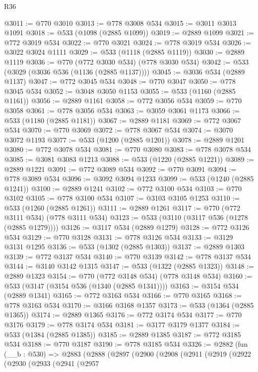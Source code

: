 \begin{lexlean}{R36}
\begin{coremodule}
@3011 := @770 @3010
@3013 := @778 @3008 @534
@3015 := @3011 @3013 @1091
@3018 := @533 (@1098 (@2885 @1099))
@3019 := @2889 @1099
@3021 := @772 @3019 @534
@3022 := @770 @3021
@3024 := @778 @3019 @534
@3026 := @3022 @3024 @1111
@3029 := @533 (@1118 (@2885 @1119))
@3030 := @2889 @1119
@3036 := @770 (@772 @3030 @534) (@778 @3030 @534)
@3042 := @533 (@3029 (@3036 @536 (@1136 (@2885 @1137))))
@3045 := @3036 @534 (@2889 @1137)
@3047 := @772 @3045 @534
@3048 := @770 @3047
@3050 := @778 @3045 @534
@3052 := @3048 @3050 @1153
@3055 := @533 (@1160 (@2885 @1161))
@3056 := @2889 @1161
@3058 := @772 @3056 @534
@3059 := @770 @3058
@3061 := @778 @3056 @534
@3063 := @3059 @3061 @1173
@3066 := @533 (@1180 (@2885 @1181))
@3067 := @2889 @1181
@3069 := @772 @3067 @534
@3070 := @770 @3069
@3072 := @778 @3067 @534
@3074 := @3070 @3072 @1193
@3077 := @533 (@1200 (@2885 @1201))
@3078 := @2889 @1201
@3080 := @772 @3078 @534
@3081 := @770 @3080
@3083 := @778 @3078 @534
@3085 := @3081 @3083 @1213
@3088 := @533 (@1220 (@2885 @1221))
@3089 := @2889 @1221
@3091 := @772 @3089 @534
@3092 := @770 @3091
@3094 := @778 @3089 @534
@3096 := @3092 @3094 @1233
@3099 := @533 (@1240 (@2885 @1241))
@3100 := @2889 @1241
@3102 := @772 @3100 @534
@3103 := @770 @3102
@3105 := @778 @3100 @534
@3107 := @3103 @3105 @1253
@3110 := @533 (@1260 (@2885 @1261))
@3111 := @2889 @1261
@3117 := @770 (@772 @3111 @534) (@778 @3111 @534)
@3123 := @533 (@3110 (@3117 @536 (@1278 (@2885 @1279))))
@3126 := @3117 @534 (@2889 @1279)
@3128 := @772 @3126 @534
@3129 := @770 @3128
@3131 := @778 @3126 @534
@3133 := @3129 @3131 @1295
@3136 := @533 (@1302 (@2885 @1303))
@3137 := @2889 @1303
@3139 := @772 @3137 @534
@3140 := @770 @3139
@3142 := @778 @3137 @534
@3144 := @3140 @3142 @1315
@3147 := @533 (@1322 (@2885 @1323))
@3148 := @2889 @1323
@3154 := @770 (@772 @3148 @534) (@778 @3148 @534)
@3160 := @533 (@3147 (@3154 @536 (@1340 (@2885 @1341))))
@3163 := @3154 @534 (@2889 @1341)
@3165 := @772 @3163 @534
@3166 := @770 @3165
@3168 := @778 @3163 @534
@3170 := @3166 @3168 @1357
@3173 := @533 (@1364 (@2885 @1365))
@3174 := @2889 @1365
@3176 := @772 @3174 @534
@3177 := @770 @3176
@3179 := @778 @3174 @534
@3181 := @3177 @3179 @1377
@3184 := @533 (@1384 (@2885 @1385))
@3185 := @2889 @1385
@3187 := @772 @3185 @534
@3188 := @770 @3187
@3190 := @778 @3185 @534
@3326 := @2882
    (fun (__b : @530) =>
    @2883
      (@2888
        (@2897
          (@2900
            (@2908
              (@2911
                (@2919
                  (@2922
                    (@2930
                      (@2933
                        (@2941
                          (@2957

\end{coremodule}
\end{lexlean}
